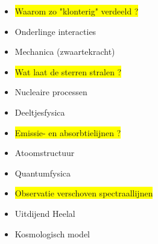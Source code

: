 \newpage

\begin{itemize}
\item \colorbox{yellow}{Waarom zo "klonterig" verdeeld ?}
\item[] Onderlinge interacties
\item[]\begin{center}{\blue Mechanica (zwaartekracht)}\end{center}
\item \colorbox{yellow}{Wat laat de sterren stralen ?}
\item[] Nucleaire processen
\item[]\begin{center}{\blue Deeltjesfysica}\end{center}
\item \colorbox{yellow}{Emissie- en absorbtielijnen ?}
\item[] Atoomstructuur
\item[]\begin{center}{\blue Quantumfysica}\end{center}
\item \colorbox{yellow}{Observatie verschoven spectraallijnen}
\item[] Uitdijend Heelal
\item[]\begin{center}{\blue Kosmologisch model}\end{center}
\end{itemize}
